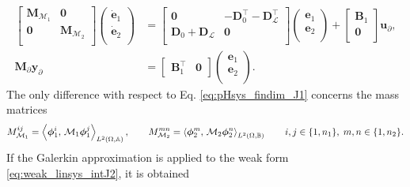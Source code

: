 \begin{equation}\label{eq:pHlinsys_findim_J1}
\begin{aligned}
\begin{bmatrix}
\mathbf{M}_{\mathcal{M}_1} & \mathbf{0} \\
\mathbf{0} & \mathbf{M}_{\mathcal{M}_2} \\
\end{bmatrix}
\begin{pmatrix}
\dot{\mathbf{e}}_{1} \\
\dot{\mathbf{e}}_{2} \\
\end{pmatrix}
&= \begin{bmatrix}
\mathbf{0} & -\mathbf{D}_{0}^\top - \mathbf{D}_{\mathcal{L}}^\top \\
\mathbf{D}_{0} + \mathbf{D}_{\mathcal{L}} & \mathbf{0} \\
\end{bmatrix} 
\begin{pmatrix}
\mathbf{e}_{1} \\
\mathbf{e}_{2} \\
\end{pmatrix} + 
\begin{bmatrix}
\mathbf{B}_1\\
\mathbf{0}\\
\end{bmatrix}
\mathbf{u}_\partial, \\
\mathbf{M}_\partial {\mathbf{y}_\partial} &= \begin{bmatrix}
\mathbf{B}_1^\top & \mathbf{0}
\end{bmatrix}\begin{pmatrix}
\mathbf{e}_{1} \\
\mathbf{e}_{2} \\
\end{pmatrix}.
\end{aligned}
\end{equation}
The only difference with respect to Eq. \eqref{eq:pHsys_findim_J1} concerns the mass matrices
\begin{equation}
M_{\mathcal{M}_1}^{ij} = \inner[L^2(\Omega, \mathbb{A})]{\bm\phi_1^i}{\mathcal{M}_1 \bm\phi_1^j}, \qquad
M_{\mathcal{M}_2}^{mn} = \inner[L^2(\Omega, \mathbb{B})]{\bm\phi_2^m}{\mathcal{M}_2 \bm\phi_2^n} \qquad i, j \in \{1, n_1\}, \; m,n \in \{1, n_2\}. 
\end{equation}
If the Galerkin approximation is applied to the weak form \eqref{eq:weak_linsys_intJ2}, it is obtained
